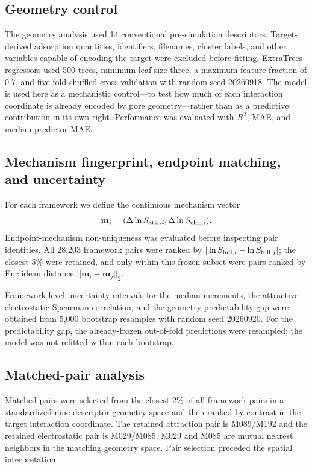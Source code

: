 \documentclass[11pt,a4paper]{article}
\begin{document}
\subsection{Geometry control}

The geometry analysis used 14 conventional pre-simulation descriptors. Target-derived adsorption quantities, identifiers, filenames, cluster labels, and other variables capable of encoding the target were excluded before fitting. ExtraTrees regressors used 500 trees, minimum leaf size three, a maximum-feature fraction of 0.7, and five-fold shuffled cross-validation with random seed 20260918. The model is used here as a mechanistic control---to test how much of each interaction coordinate is already encoded by pore geometry---rather than as a predictive contribution in its own right. Performance was evaluated with $R^2$, MAE, and median-predictor MAE.

\subsection{Mechanism fingerprint, endpoint matching, and uncertainty}

For each framework we define the continuous mechanism vector
\begin{equation}
\mathbf{m}_i=(\Delta\ln S_{{\rm attr},i},\Delta\ln S_{{\rm elec},i}).
\end{equation}
Endpoint-mechanism non-uniqueness was evaluated before inspecting pair identities. All 28,203 framework pairs were ranked by $|\ln S_{{\rm full},i}-\ln S_{{\rm full},j}|$; the closest 5\% were retained, and only within this frozen subset were pairs ranked by Euclidean distance $||\mathbf{m}_i-\mathbf{m}_j||_2$.

Framework-level uncertainty intervals for the median increments, the attractive--electrostatic Spearman correlation, and the geometry predictability gap were obtained from 5,000 bootstrap resamples with random seed 20260920. For the predictability gap, the already-frozen out-of-fold predictions were resampled; the model was not refitted within each bootstrap.

\subsection{Matched-pair analysis}

Matched pairs were selected from the closest 2\% of all framework pairs in a standardized nine-descriptor geometry space and then ranked by contrast in the target interaction coordinate. The retained attraction pair is M089/M192 and the retained electrostatic pair is M029/M085. M029 and M085 are mutual nearest neighbors in the matching geometry space. Pair selection preceded the spatial interpretation.
\end{document}
